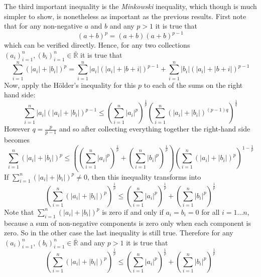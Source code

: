 \documentclass[a4paper]{article}
\newcommand{\brac}[1]{{\left({#1}\right)}}
\newcommand{\abs}[1]{\left | {#1}\right |}
\begin{document}
The third important inequality is the \emph{Minkowski} inequality, which though is much simpler to show, is nonetheless as important as the previous results. First note that for any non-negative $a$ and $b$ and any $p>1$ it is true that \[\brac{a+b}^p = \brac{a+b} \brac{a+b}^{p-1}\] which can be verified directly. Hence, for any two collections $\brac{a_i}_{i=1}^n, \brac{b_i}_{i=1}^n\in \bar{\mathbb{R}}$ it is true that \[\sum_{i=1}^n \brac{\abs{a_i} + \abs{b_i}}^p = \sum_{i=1}^n \abs{a_i}\brac{\abs{a_i} + \abs{b+i}}^{p-1} + \sum_{i=1}^n \abs{b_i}\brac{\abs{a_i} + \abs{b+i}}^{p-1}\]
Now, apply the H\"older's inequality for this $p$ to each of the sums on the right hand side: \[\sum_{i=1}^n \abs{a_i}\brac{\abs{a_i} + \abs{b_i}}^{p-1}\leq \brac{\sum_{i=1}^n \abs{a_i}^p}^\frac{1}{p} \brac{\sum_{i=1}^n \brac{\abs{a_i} + \abs{b_i}}^{(p-1)q}}^\frac{1}{q}\] However $q = \frac{p}{p-1}$ and so after collecting everything together the right-hand side becomes \[\sum_{i=1}^n \brac{\abs{a_i} + \abs{b_i}}^p \leq \brac{\brac{\sum_{i=1}^n \abs{a_i}^p}^\frac{1}{p} + \brac{\sum_{i=1}^n \abs{b_i}^p}^\frac{1}{p}} \brac{\sum_{i=1}^n \brac{\abs{a_i} + \abs{b_i}}^p}^{1-\frac{1}{p}}\] If $\sum_{i=1}^n \brac{\abs{a_i} + \abs{b_i}}^p\neq 0$, then this inequality transforms into\[\brac{\sum_{i=1}^n \brac{\abs{a_i} + \abs{b_i}}^p}^\frac{1}{p} \leq \brac{\sum_{i=1}^n \abs{a_i}^p}^\frac{1}{p} + \brac{\sum_{i=1}^n \abs{b_i}^p}^\frac{1}{p}\] Note that $\sum_{i=1}^n \brac{\abs{a_i} + \abs{b_i}}^p$ is zero if and only if $a_i=b_i=0$ for all $i=1\ldots n$, because a sum of non-negative components is zero only when each component is zero. So in the other case the last inequality is still true.
Therefore for any $\brac{a_i}_{i=1}^n, \brac{b_i}_{i=1}^n\in \bar{\mathbb{R}}$ and any $p>1$ it is true that\[\brac{\sum_{i=1}^n \brac{\abs{a_i} + \abs{b_i}}^p}^\frac{1}{p} \leq \brac{\sum_{i=1}^n \abs{a_i}^p}^\frac{1}{p} + \brac{\sum_{i=1}^n \abs{b_i}^p}^\frac{1}{p}\]

\end{document}
